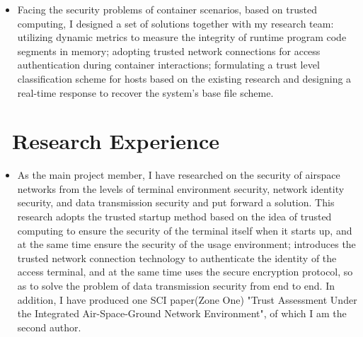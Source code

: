\documentclass{resume}
\begin{document}
\begin{itemize}
  \item Facing the security problems of container scenarios, based on trusted computing, I designed a set of solutions together with my research team: utilizing dynamic metrics to measure the integrity of runtime program code segments in memory; adopting trusted network connections for access authentication during container interactions; formulating a trust level classification scheme for hosts based on the existing research and designing a real-time response to recover the system's base file scheme.
\end{itemize}


\section{\faInfo\ Research Experience}

\begin{itemize}
  \item As the main project member, I have researched on the security of airspace networks from the levels of terminal environment security, network identity security, and data transmission security and put forward a solution. This research adopts the trusted startup method based on the idea of trusted computing to ensure the security of the terminal itself when it starts up, and at the same time ensure the security of the usage environment; introduces the trusted network connection technology to authenticate the identity of the access terminal, and at the same time uses the secure encryption protocol, so as to solve the problem of data transmission security from end to end. In addition, I have produced one SCI paper(Zone One) "Trust Assessment Under the Integrated Air-Space-Ground Network Environment", of which I am the second author.
\end{itemize}
\end{document}
